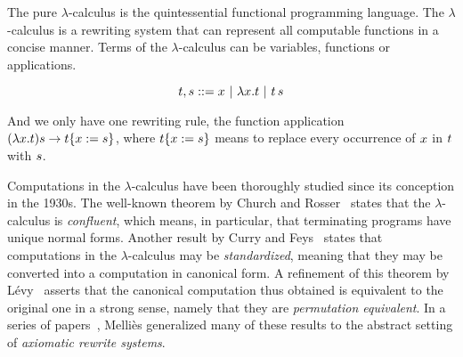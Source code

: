 \bigskip

The pure $\lambda$-calculus is the quintessential functional programming language.
The $\lambda$-calculus is a rewriting system that can represent all computable functions in a concise manner.
Terms of the $\lambda$-calculus can be variables, functions or applications.

\[
  \tm, \tmtwo ::= \var \ | \ \lam{\var}{\tm} \ | \ \tm\, \tmtwo
\]

And we only have one rewriting rule, the function application
$(\lambda x. t) s \to t\{x := s\}$,
where $t\{x := s\}$ means to replace every occurrence of $x$ in $t$ with $s$.

Computations in the $\lambda$-calculus have been thoroughly
studied since its conception in the 1930s.
The well-known theorem by Church and Rosser~\cite{church1936some}
states that the $\lambda$-calculus is \emph{confluent},
which means, in particular, that terminating programs have unique normal forms.
Another result by Curry and Feys~\cite{curry1958combinatory}
states that computations in the
$\lambda$-calculus may be \emph{standardized},
meaning that they may be converted into a computation in canonical form.
A refinement of this theorem by L\'evy~\cite{Tesis:Levy:1978}
asserts that the canonical computation thus obtained is equivalent to the
original one in a strong sense, namely that they are \emph{permutation equivalent}.
In a series of papers~\cite{DBLP:conf/ctcs/Mellies97,DBLP:journals/logcom/Mellies00,DBLP:conf/rta/Mellies02,mellies2002axiomatic,DBLP:conf/birthday/Mellies05},
Melli\`es generalized many of these results to the abstract setting of {\em axiomatic rewrite systems}.

